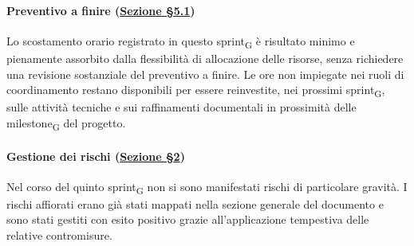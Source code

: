 ﻿\documentclass[a4paper, 10pt, colorlinks=true, linkcolor=black, urlcolor=blue, citecolor=blue, hidelinks]{article}
\begin{document}
\paragraph{Preventivo a finire (\hyperref[tab:preventivo-finire]{Sezione \S5.1})}
Lo scostamento orario registrato in questo sprint\textsubscript{G} è risultato minimo e pienamente assorbito dalla flessibilità di allocazione delle risorse, senza richiedere una revisione sostanziale del preventivo a finire. Le ore non impiegate nei ruoli di coordinamento restano disponibili per essere reinvestite, nei prossimi sprint\textsubscript{G}, sulle attività tecniche e sui raffinamenti documentali in prossimità delle milestone\textsubscript{G} del progetto.

\paragraph{Gestione dei rischi (\hyperref[tab:gestione-rischi]{Sezione \S2})}
Nel corso del quinto sprint\textsubscript{G} non si sono manifestati rischi di particolare gravità. I rischi affiorati erano già stati mappati nella sezione generale del documento e sono stati gestiti con esito positivo grazie all'applicazione tempestiva delle relative contromisure.
\end{document}
